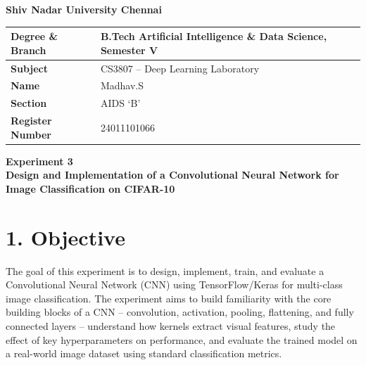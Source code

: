 \documentclass[11pt]{article}
\begin{document}
\begin{center}
{\LARGE\textbf{Shiv Nadar University Chennai}}\\[4mm]
\end{center}

\renewcommand{\arraystretch}{1.6}
\setlength{\tabcolsep}{10pt}

\begin{center}
\begin{tabular}{|p{4cm}|p{9.5cm}|}
\hline
\textbf{Degree \& Branch} & B.Tech Artificial Intelligence \& Data Science, Semester V \\ \hline
\textbf{Subject} & CS3807 -- Deep Learning Laboratory \\ \hline
\textbf{Name} & Madhav.S \\ \hline
\textbf{Section} & AIDS `B' \\ \hline
\textbf{Register Number} & 24011101066 \\ \hline
\end{tabular}
\end{center}

\vspace{5mm}

\begin{center}
{\Large\textbf{Experiment 3}}\\[1mm]
{\large\textbf{Design and Implementation of a Convolutional Neural Network for Image Classification on CIFAR-10}}
\end{center}

\vspace{4mm}


\section*{1. Objective}

The goal of this experiment is to design, implement, train, and evaluate a Convolutional Neural Network (CNN) using TensorFlow/Keras for multi-class image classification. The experiment aims to build familiarity with the core building blocks of a CNN -- convolution, activation, pooling, flattening, and fully connected layers -- understand how kernels extract visual features, study the effect of key hyperparameters on performance, and evaluate the trained model on a real-world image dataset using standard classification metrics.

\end{document}
